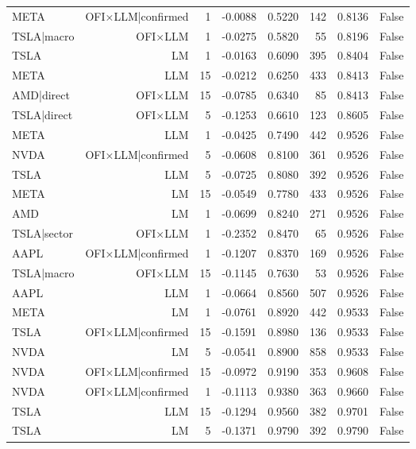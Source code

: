 \begin{table}[htbp]
\begin{tabular}{lrrrrrrr}
META & OFI×LLM|confirmed & 1 & -0.0088 & 0.5220 & 142 & 0.8136 & False \\
TSLA|macro & OFI×LLM & 1 & -0.0275 & 0.5820 & 55 & 0.8196 & False \\
TSLA & LM & 1 & -0.0163 & 0.6090 & 395 & 0.8404 & False \\
META & LLM & 15 & -0.0212 & 0.6250 & 433 & 0.8413 & False \\
AMD|direct & OFI×LLM & 15 & -0.0785 & 0.6340 & 85 & 0.8413 & False \\
TSLA|direct & OFI×LLM & 5 & -0.1253 & 0.6610 & 123 & 0.8605 & False \\
META & LLM & 1 & -0.0425 & 0.7490 & 442 & 0.9526 & False \\
NVDA & OFI×LLM|confirmed & 5 & -0.0608 & 0.8100 & 361 & 0.9526 & False \\
TSLA & LLM & 5 & -0.0725 & 0.8080 & 392 & 0.9526 & False \\
META & LM & 15 & -0.0549 & 0.7780 & 433 & 0.9526 & False \\
AMD & LM & 1 & -0.0699 & 0.8240 & 271 & 0.9526 & False \\
TSLA|sector & OFI×LLM & 1 & -0.2352 & 0.8470 & 65 & 0.9526 & False \\
AAPL & OFI×LLM|confirmed & 1 & -0.1207 & 0.8370 & 169 & 0.9526 & False \\
TSLA|macro & OFI×LLM & 15 & -0.1145 & 0.7630 & 53 & 0.9526 & False \\
AAPL & LLM & 1 & -0.0664 & 0.8560 & 507 & 0.9526 & False \\
META & LM & 1 & -0.0761 & 0.8920 & 442 & 0.9533 & False \\
TSLA & OFI×LLM|confirmed & 15 & -0.1591 & 0.8980 & 136 & 0.9533 & False \\
NVDA & LM & 5 & -0.0541 & 0.8900 & 858 & 0.9533 & False \\
NVDA & OFI×LLM|confirmed & 15 & -0.0972 & 0.9190 & 353 & 0.9608 & False \\
NVDA & OFI×LLM|confirmed & 1 & -0.1113 & 0.9380 & 363 & 0.9660 & False \\
TSLA & LLM & 15 & -0.1294 & 0.9560 & 382 & 0.9701 & False \\
TSLA & LM & 5 & -0.1371 & 0.9790 & 392 & 0.9790 & False \\
\bottomrule
\end{tabular}
\end{table}
